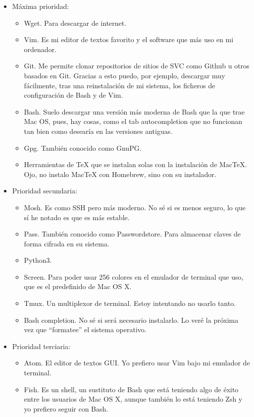 \begin{itemize}
  \item Máxima prioridad:
  \begin{itemize}
    \item Wget. Para descargar de internet.
    \item Vim. Es mi editor de textos favorito y el software que más uso en mi ordenador.
    \item Git. Me permite clonar repositorios de sitios de SVC como Github u otros basados en Git. Gracias a
      esto puedo, por ejemplo, descargar muy fácilmente, tras una reinstalación de mi sistema, los ficheros de
      configuración de Bash y de Vim.
    \item Bash. Suelo descargar una versión más moderna de Bash que la que trae Mac OS, pues, hay cosas, como el
      tab autocompletion que no funcionan tan bien como desearía en las versiones antiguas.
    \item Gpg. También conocido como GnuPG.
    \item Herramientas de \TeX{} que se instalan solas con la instalación de MacTeX. Ojo, no instalo
      MacTeX con Homebrew, sino con su instalador.
  \end{itemize}
  \item Prioridad secundaria:
    \begin{itemize}
      \item Mosh. Es como SSH pero más moderno. No sé si es menos seguro, lo que sí he notado es que es más
        estable.
      \item Pass. También conocido como Passwordstore. Para almacenar claves de forma cifrada en su sistema.
      \item Python3.
      \item Screen. Para poder usar 256 colores en el emulador de terminal que uso, que es el predefinido de Mac
        OS X.
      \item Tmux. Un multiplexor de terminal. Estoy intentando no usarlo tanto.
      \item Bash completion. No sé si será necesario instalarlo. Lo veré la próxima vez que ``formatee'' el
        sistema operativo.
\end{itemize}
  \item Prioridad terciaria:
    \begin{itemize}
      \item Atom. El editor de textos GUI. Yo prefiero usar Vim bajo mi emulador de terminal.
      \item Fish. Es un shell, un sustituto de Bash que está teniendo algo de éxito entre los usuarios de Mac OS
        X, aunque también lo está teniendo Zsh y yo prefiero seguir con Bash.
    \end{itemize}
\end{itemize}

